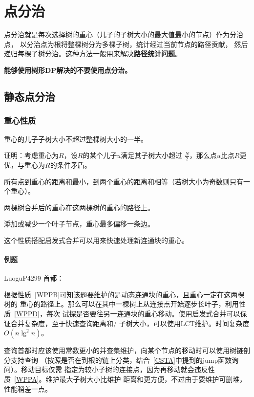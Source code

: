 \section{点分治}
点分治就是每次选择树的重心（儿子的子树大小的最大值最小的节点）作为分治点，
以分治点为根将整棵树分为多棵子树，统计经过当前节点的路径贡献，
然后递归每棵子树分治。这种方法一般用来解决{\bfseries 路径统计问题}。

{\bfseries 能够使用树形DP解决的不要使用点分治。}
\subsection{静态点分治}
\subsubsection{重心性质}
\begin{property}\label{WPPA}
    重心的儿子子树大小不超过整棵树大小的一半。
\end{property}
证明：考虑重心为$R$，设$R$的某个儿子$u$满足其子树大小超过
$\frac{N}{2}$，那么点$u$比点$R$更优，与重心为$R$的条件矛盾。
\begin{property}\label{WPPB}
    所有点到重心的距离和最小，到两个重心的距离和相等（若树大小为奇数则只有一个重心）。
\end{property}
\begin{property}\label{WPPC}
    两棵树合并后的重心在这两棵树的重心的路径上。
\end{property}
\begin{property}\label{WPPD}
    添加或减少一个叶子节点，重心最多偏移一条边。
\end{property}

这个性质搭配启发式合并可以用来快速处理新连通块的重心。

\paragraph{例题} LuoguP4299 首都：

根据性质~\ref{WPPB}可知该题要维护的是动态连通块的重心，且重心一定在这两棵树的
重心的路径上。那么可以在其中一棵树上从连接点开始逐步长叶子，利用性质~\ref{WPPD}，每次
试探是否要往另一连通块的重心移动。使用启发式合并可以保证合并复杂度，至于快速查询距离和/
子树大小，可以使用LCT维护。时间复杂度$O(n\lg^2n)$。

查询首都时应该使用常数更小的并查集维护，向某个节点的移动时可以使用树链剖分支持查询
（按照是否在到根的链上分类，结合~\ref{CSTA}中提到的jump函数询问）。移动目标仅需
指定为较小子树的连接点，因为再移动就会违反性质~\ref{WPPA}。维护最大子树大小比维护
距离和更方便，不过由于要维护可删堆，性能稍差一点。

